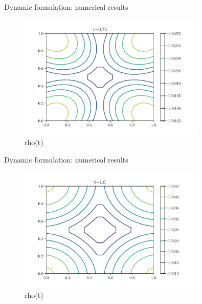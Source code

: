 \documentclass{beamer}
\begin{document}
\begin{frame}{Dynamic formulation: numerical results}
\begin{figure}
    \centering
    \includegraphics[width=0.8\textwidth]{graphics/rho(3).pdf}
    \caption{rho(t)}
    \label{fig:nu}
\end{figure}
\end{frame}
\begin{frame}{Dynamic formulation: numerical results}
\begin{figure}
    \centering
    \includegraphics[width=0.8\textwidth]{graphics/rho(4).pdf}
    \caption{rho(t)}
    \label{fig:nu}
\end{figure}
\end{frame}
\end{document}
